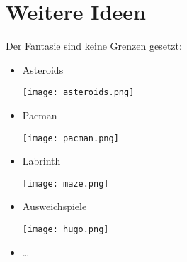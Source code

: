 \documentclass[
  accentcolor=tud1c,	%
  colorbacktitle,		%
  inverttitle,			%
  german,				%
  twoside
]{tudexercise}
\begin{document}
\section{Weitere Ideen}

Der Fantasie sind keine Grenzen gesetzt:

\begin{itemize}
\item Asteroids\\
\begin{center}\texttt{[image: asteroids.png]}\end{center}
\item Pacman\\
\begin{center}\texttt{[image: pacman.png]}\end{center}
\item Labrinth
\begin{center}\texttt{[image: maze.png]}\end{center}
\item \glqq Ausweichspiele\grqq{} 
\begin{center}\texttt{[image: hugo.png]}\end{center}
\item \dots
\end{itemize}
\end{document}
